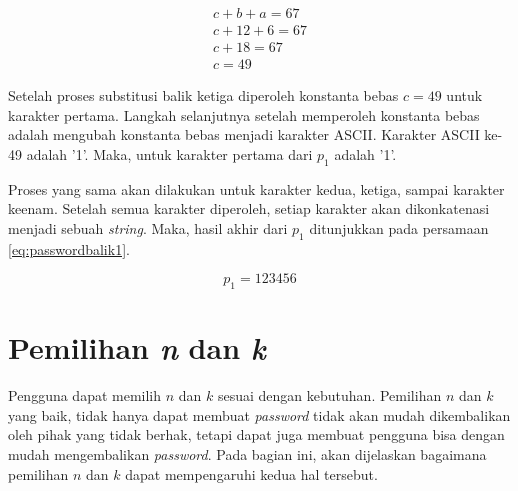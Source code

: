 \begin{align}
	c + b + a = 67 \nonumber \\
	c + 12 + 6 = 67 \nonumber \\
	c + 18 = 67 \nonumber \\
	c = 49 \label{eq:gauss8}
\end{align}

Setelah proses substitusi balik ketiga diperoleh konstanta bebas \begin{math}c=49\end{math} untuk karakter pertama. Langkah selanjutnya setelah memperoleh konstanta bebas adalah mengubah konstanta bebas menjadi karakter ASCII. Karakter ASCII ke-49 adalah '1'. Maka, untuk karakter pertama dari \begin{math}p_1\end{math} adalah '1'.

Proses yang sama akan dilakukan untuk karakter kedua, ketiga, sampai karakter keenam. Setelah semua karakter diperoleh, setiap karakter akan dikonkatenasi menjadi sebuah \textit{string}. Maka, hasil akhir dari \begin{math}p_1\end{math} ditunjukkan pada persamaan \ref{eq:passwordbalik1}.

\begin{equation}
	p_1 = 123456 \label{eq:passwordbalik1}
\end{equation}

\section{Pemilihan \textit{n} dan \textit{k}}\label{subsec:pilihnk}

Pengguna dapat memilih \begin{math}n\end{math} dan \begin{math}k\end{math} sesuai dengan kebutuhan. Pemilihan \begin{math}n\end{math} dan \begin{math}k\end{math} yang baik, tidak hanya dapat membuat \textit{password} tidak akan mudah dikembalikan oleh pihak yang tidak berhak, tetapi dapat juga membuat pengguna bisa dengan mudah mengembalikan \textit{password}\cite{ellison2000protecting}. Pada bagian ini, akan dijelaskan bagaimana pemilihan \begin{math}n\end{math} dan \begin{math}k\end{math} dapat mempengaruhi kedua hal tersebut.

